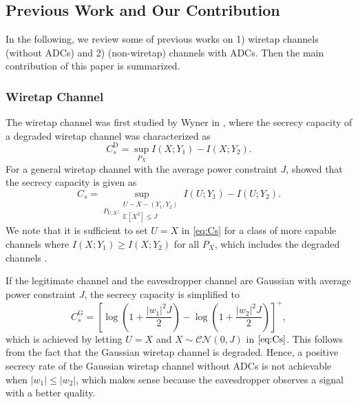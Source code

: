 \documentclass[journal]{IEEEtran}
\begin{document}
\subsection{Previous Work and Our Contribution} \label{subsec:prev}
In the following, we review some of previous works on 1) wiretap channels (without ADCs) and 2) (non-wiretap) channels with ADCs. Then the main contribution of this paper is summarized. 
\subsubsection{Wiretap Channel}
The wiretap channel was first studied by Wyner in \cite{wyner}, where the secrecy capacity of a degraded wiretap channel was characterized as
\begin{equation}\label{eq:Degraded_Cs}
    C^{\text{D}}_s = \sup\limits_{P_X} I(X;Y_1)-I(X;Y_2).
\end{equation}
For a general wiretap channel with the average power constraint $J$, \cite{secrecycapacity} showed that the secrecy capacity is given as
\begin{equation} \label{eq:Cs}
    C_s = \sup\limits_{P_{U,X}:\substack{U-X-(Y_1,Y_2) \\ \mathbb{E}[X^2] \leq J}} I(U;Y_1) - I(U;Y_2).
\end{equation}
We note that it is sufficient to set $U=X$ in \eqref{eq:Cs} for a class of more capable channels where $I(X;Y_1) \geq I(X;Y_2)$ for all $P_X$, which includes the degraded channels \cite{secrecycapacity}. 

If the legitimate channel and the eavesdropper channel are Gaussian \cite{gaussianwiretap,Mimowiretap} with average power constraint $J$, the secrecy capacity is simplified to
\begin{equation}
    C_s^{\text{G}}
    = \left[ \log\left(1+ \frac{|w_1|^2 J}{2} \right)
     - \log\left( 1+ \frac{|w_2|^2 J}{2} \right) \right]^+,
\end{equation}
which is achieved by letting $U=X$ and $X \sim \mathcal{CN}(0,J)$ in $\eqref{eq:Cs}$. This follows from the fact that the Gaussian wiretap channel is degraded. Hence, a positive secrecy rate of the Gaussian wiretap channel without ADCs is not achievable when $|w_1|\leq |w_2|$, which makes sense because the eavesdropper observes a signal with a better quality. 
\end{document}
